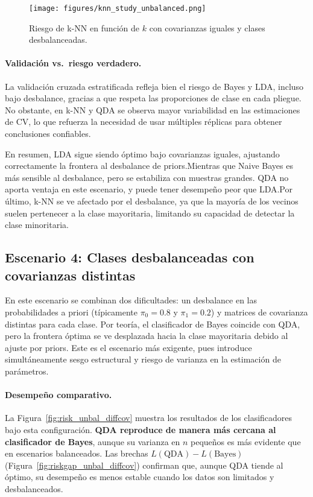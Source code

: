 \documentclass[10pt]{article}
\begin{document}
\begin{figure}[H]
    \centering
    \texttt{[image: figures/knn\_study\_unbalanced.png]}
    \caption{Riesgo de k-NN en función de $k$ con covarianzas iguales y clases desbalanceadas.}
    \label{fig:knn_unbal_samecov}
\end{figure}

\paragraph{Validación vs.\ riesgo verdadero.}
La validación cruzada estratificada refleja bien el riesgo de Bayes y LDA, incluso bajo desbalance, 
gracias a que respeta las proporciones de clase en cada pliegue. 
No obstante, en k-NN y QDA se observa mayor variabilidad en las estimaciones de CV, 
lo que refuerza la necesidad de usar múltiples réplicas para obtener conclusiones confiables.

En resumen, LDA sigue siendo óptimo bajo covarianzas iguales, ajustando correctamente la frontera al desbalance de priors.Mientras que Naive Bayes es más sensible al desbalance, pero se estabiliza con muestras grandes. QDA no aporta ventaja en este escenario, y puede tener desempeño peor que LDA.Por último, k-NN se ve afectado por el desbalance, ya que la mayoría de los vecinos suelen pertenecer a la clase mayoritaria, limitando su capacidad de detectar la clase minoritaria.

\subsection*{Escenario 4: Clases desbalanceadas con covarianzas distintas}

En este escenario se combinan dos dificultades: un desbalance en las probabilidades a priori 
(típicamente $\pi_0=0.8$ y $\pi_1=0.2$) y matrices de covarianza distintas para cada clase. 
Por teoría, el clasificador de Bayes coincide con QDA, pero la frontera óptima se ve desplazada hacia la clase mayoritaria 
debido al ajuste por priors. Este es el escenario más exigente, pues introduce simultáneamente sesgo estructural y 
riesgo de varianza en la estimación de parámetros.

\paragraph{Desempeño comparativo.}
La Figura~\ref{fig:risk_unbal_diffcov} muestra los resultados de los clasificadores bajo esta configuración. 
\textbf{QDA reproduce de manera más cercana al clasificador de Bayes}, aunque su varianza en $n$ pequeños es más evidente que en escenarios balanceados. 
Las brechas $L(\text{QDA})-L(\text{Bayes})$ (Figura~\ref{fig:riskgap_unbal_diffcov}) confirman que, aunque QDA tiende al óptimo, 
su desempeño es menos estable cuando los datos son limitados y desbalanceados.
\end{document}
